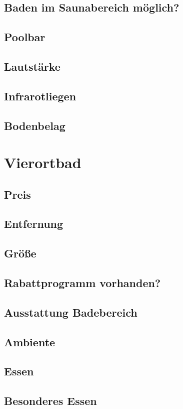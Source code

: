 \documentclass{article}
\begin{document}
\subsection*{Baden im Saunabereich möglich?}
\subsection*{Poolbar}
\subsection*{Lautstärke}
\subsection*{Infrarotliegen}
\subsection*{Bodenbelag}
\pagebreak

\section*{Vierortbad}
\subsection*{Preis}
\subsection*{Entfernung}
\subsection*{Größe}
\subsection*{Rabattprogramm vorhanden?}
\subsection*{Ausstattung Badebereich}
\subsection*{Ambiente}
\subsection*{Essen}
\subsection*{Besonderes Essen}
\end{document}
